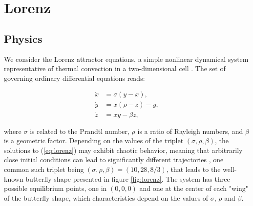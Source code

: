 \chapter{Lorenz}

\section{Physics}

We consider the Lorenz attractor equations, a simple nonlinear dynamical system representative of thermal convection in a two-dimensional cell \cite{saltzman1962}. The set of governing ordinary differential equations reads:

\begin{equation}
\label{eq:lorenz}
\begin{split}
	\dot{x} 	&= \sigma (y - x), \\
	\dot{y}	&= x(\rho - z) - y, \\
	\dot{z}	&= xy - \beta z,
\end{split}
\end{equation}
 
where $\sigma$ is related to the Prandtl number, $\rho$ is a ratio of Rayleigh numbers, and $\beta$ is a geometric factor. Depending on the values of the triplet $(\sigma, \rho, \beta)$, the solutions to (\ref{eq:lorenz}) may exhibit chaotic behavior, meaning that arbitrarily close initial conditions can lead to significantly different trajectories \cite{lorenz1963}, one common such triplet being $(\sigma, \rho, \beta) = (10, 28, 8/3)$, that leads to the well-known butterfly shape presented in figure \ref{fig:lorenz}. The system has three possible equilibrium points, one in $(0,0,0)$ and one at the center of each "wing" of the butterfly shape, which characteristics depend on the values of $\sigma$, $\rho$ and $\beta$.

\bigskip



